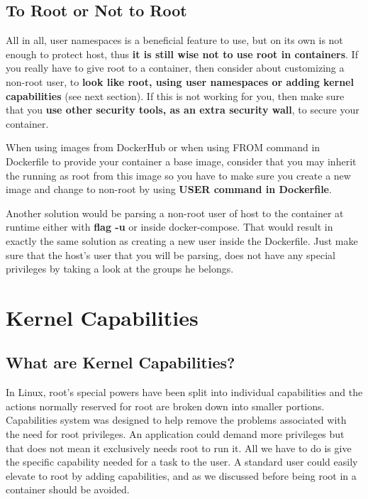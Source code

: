 \subsection{To Root or Not to Root}
All in all, user namespaces is a beneficial feature to use, but on its own is not enough to protect host, thus \textbf{it is still wise not to use root in containers}. If you really have to give root to a container, then consider about customizing a non-root user, to \textbf{look like root, using user namespaces or adding kernel capabilities} (see next section). If this is not working for you, then make sure that you \textbf{use other security tools, as an extra security wall}, to secure your container. 

\begin{mdframed}[backgroundcolor=navajowhite]
When using images from DockerHub or when using FROM command in Dockerfile to provide your container a base image, consider that you may inherit the running as root from this image so you have to make sure you create a new image and change to non-root by using \textbf{USER command in Dockerfile}.

Another solution would be parsing a non-root user of host to the container at runtime either with \textbf{flag -u} or inside docker-compose. That would result in exactly the same solution as creating a new user inside the Dockerfile. Just make sure that the host's user that you will be parsing, does not have any special privileges by taking a look at the groups he belongs.
\end{mdframed}

\section{Kernel Capabilities} \label{kernelcaps}
\subsection{What are Kernel Capabilities?}
In Linux, root's special powers have been split into individual capabilities and the actions normally reserved for root are broken down into smaller portions. Capabilities system was designed to help remove the problems associated with the need for root privileges. An application could demand more privileges but that does not mean it exclusively needs root to run it. All we have to do is give the specific capability needed for a task to the user. 
A standard user could easily elevate to root by adding capabilities, and as we discussed before being root in a container should be avoided.

